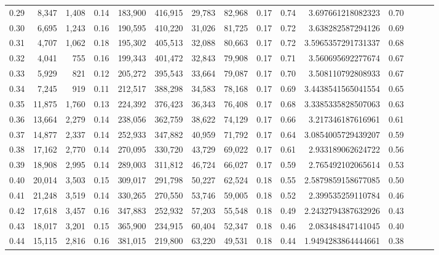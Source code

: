 \begin{tabular}{rrrrrrrrrrrrrrr}
0.29 &   8,347 &  1,408 &  0.14 &  183,900 &  416,915 &   29,783 &   82,968 &  0.17 &  0.74 &    3.697661218082323 &      0.70 \\
0.30 &   6,695 &  1,243 &  0.16 &  190,595 &  410,220 &   31,026 &   81,725 &  0.17 &  0.72 &    3.638282587294126 &      0.69 \\
0.31 &   4,707 &  1,062 &  0.18 &  195,302 &  405,513 &   32,088 &   80,663 &  0.17 &  0.72 &   3.5965357291731337 &      0.68 \\
0.32 &   4,041 &    755 &  0.16 &  199,343 &  401,472 &   32,843 &   79,908 &  0.17 &  0.71 &    3.560695692277674 &      0.67 \\
0.33 &   5,929 &    821 &  0.12 &  205,272 &  395,543 &   33,664 &   79,087 &  0.17 &  0.70 &    3.508110792808933 &      0.67 \\
0.34 &   7,245 &    919 &  0.11 &  212,517 &  388,298 &   34,583 &   78,168 &  0.17 &  0.69 &   3.4438541565041554 &      0.65 \\
0.35 &  11,875 &  1,760 &  0.13 &  224,392 &  376,423 &   36,343 &   76,408 &  0.17 &  0.68 &   3.3385335828507063 &      0.63 \\
0.36 &  13,664 &  2,279 &  0.14 &  238,056 &  362,759 &   38,622 &   74,129 &  0.17 &  0.66 &    3.217346187616961 &      0.61 \\
0.37 &  14,877 &  2,337 &  0.14 &  252,933 &  347,882 &   40,959 &   71,792 &  0.17 &  0.64 &   3.0854005729439207 &      0.59 \\
0.38 &  17,162 &  2,770 &  0.14 &  270,095 &  330,720 &   43,729 &   69,022 &  0.17 &  0.61 &    2.933189062624722 &      0.56 \\
0.39 &  18,908 &  2,995 &  0.14 &  289,003 &  311,812 &   46,724 &   66,027 &  0.17 &  0.59 &    2.765492102065614 &      0.53 \\
0.40 &  20,014 &  3,503 &  0.15 &  309,017 &  291,798 &   50,227 &   62,524 &  0.18 &  0.55 &   2.5879859158677085 &      0.50 \\
0.41 &  21,248 &  3,519 &  0.14 &  330,265 &  270,550 &   53,746 &   59,005 &  0.18 &  0.52 &    2.399535259110784 &      0.46 \\
0.42 &  17,618 &  3,457 &  0.16 &  347,883 &  252,932 &   57,203 &   55,548 &  0.18 &  0.49 &   2.2432794387632926 &      0.43 \\
0.43 &  18,017 &  3,201 &  0.15 &  365,900 &  234,915 &   60,404 &   52,347 &  0.18 &  0.46 &    2.083484847141045 &      0.40 \\
0.44 &  15,115 &  2,816 &  0.16 &  381,015 &  219,800 &   63,220 &   49,531 &  0.18 &  0.44 &   1.9494283864444661 &      0.38 \\

\end{tabular}
